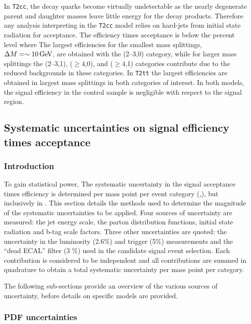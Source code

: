 In \verb!T2cc!, the decay quarks become virtually undetectable as 
the nearly degenerate parent and daughter masses leave little energy for the decay 
products. Therefore any analysis interpreting in the \verb!T2cc! model 
relies on hard-\Pt jets from initial state radiation for acceptance. The 
efficiency times acceptance is below the percent level where The largest 
efficiencies for the smallest mass splittings, $\Delta M = \sim10\,\text{Ge\hspace{-.08em}V}$, 
are obtained with the (2--3,0) category, while for larger mass splittings 
the (2--3,1), ($\geq 4$,0), and ($\geq 4$,1) categories contribute 
due to the reduced backgrounds in these categories. In \verb!T2tt! the largest
efficiencies are obtained in largest mass splittings in both categories of interest. 
In both models, the signal efficiency in the \mj control sample is negligible 
with respect to the signal region. 

\clearpage
\subsection{Systematic uncertainties on signal efficiency times 
  acceptance\label{sec:sms-syst}}

\subsubsection{Introduction} 

To gain statistical power, The systematic uncertainty in the signal 
acceptance times efficiency is determined per mass point per event 
category (\njet,\nb), but inclusively in \scalht . This section details the methods 
used to determine the magnitude of the systematic uncertainties to be applied. 
Four sources of uncertainty are measured: the jet energy scale,
the parton distribution functions, initial state radiation and b-tag scale
factors. Three other uncertainties are quoted: the uncertainty in the luminosity (2.6\%) and
trigger (5\%) measurements and the ``dead ECAL'' filter (3 \%) used in the candidate signal
event selection. Each contribution is considered to be independent 
and all contributions are summed in quadrature to obtain a total 
systematic uncertainty per mass point per category.

The following sub-sections provide an overview of the various sources of
uncertainty, before details on specific models are provided. 

\subsubsection{PDF uncertainties\label{sec:pdf-sets}}


